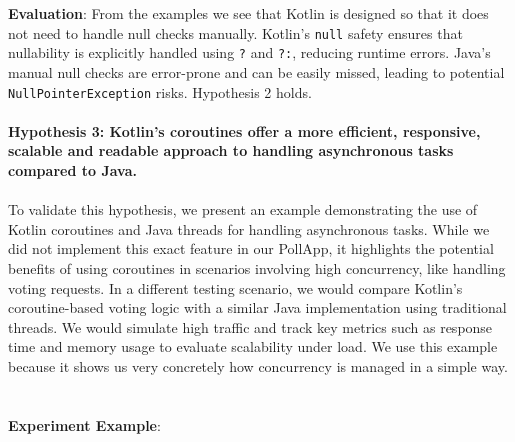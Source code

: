 \noindent \textbf{Evaluation}: From the examples we see that Kotlin is designed so that it does not need to handle null checks manually. Kotlin’s \texttt{null} safety ensures that nullability is explicitly handled using \texttt{?} and \texttt{?:}, reducing runtime errors. Java’s manual null checks are error-prone and can be easily missed, leading to potential \texttt{NullPointerException} risks. Hypothesis 2 holds.
\\
\\
\textbf{Hypothesis 3: Kotlin's coroutines offer a more efficient, responsive, scalable and readable approach to handling asynchronous tasks compared to Java.}
\\
\\ 
To validate this hypothesis, we present an example demonstrating the use of Kotlin coroutines and Java threads for handling asynchronous tasks. While we did not implement this exact feature in our PollApp, it highlights the potential benefits of using coroutines in scenarios involving high concurrency, like handling voting requests. In a different testing scenario, we would compare Kotlin’s coroutine-based voting logic with a similar Java implementation using traditional threads. We would simulate high traffic and track key metrics such as response time and memory usage to evaluate scalability under load. We use this example because it shows us very concretely how concurrency is managed in a simple way. 
\\
\\
\\
\textbf{Experiment Example}:
